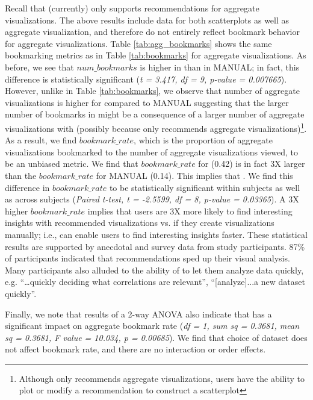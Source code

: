 Recall that \SeeDB (currently) only supports recommendations for aggregate visualizations.
The above results include data for both scatterplots as well as aggregate visualization, and
therefore do not entirely reflect bookmark behavior for aggregate visualizations.
Table \ref{tab:agg_bookmarks} shows the same bookmarking metrics as in Table \ref{tab:bookmarks}
for aggregate visualizations.
As before, we see that $num\_bookmarks$ is higher in \SeeDB than in MANUAL; in fact, this difference
is statistically significant ({\em t = 3.417, df = 9, p-value = 0.007665}).
However, unlike in Table \ref{tab:bookmarks}, we observe that number of aggregate visualizations 
is higher for \SeeDB compared to MANUAL suggesting that the larger number of bookmarks in \SeeDB 
might be a consequence of a larger number of aggregate visualizations with \SeeDB (possibly because
\SeeDB only recommends aggregate visualizations)\footnote{Although \SeeDB only recommends aggregate
visualizations, users have the ability to plot or modify a recommendation to construct a scatterplot}.
As a result, we find $bookmark\_rate$, which is the proportion of aggregate visualizations bookmarked
to the number of aggregate visualizations viewed, to be an unbiased metric.
We find that $bookmark\_rate$ for \SeeDB (0.42) is in fact 3X larger than the $bookmark\_rate$ for 
MANUAL (0.14).
This implies that .
We find this difference in $bookmark\_rate$ to be statistically significant within subjects as well 
as across subjects ({\em Paired t-test, t = -2.5599, df = 8, p-value = 0.03365}).
A 3X higher $bookmark\_rate$ implies that users are 3X more likely to find interesting insights with 
recommended visualizations vs. if they create visualizations manually; i.e., \SeeDB can enable users 
to find interesting insights faster.
These statistical results are supported by anecdotal and survey data from study participants.
87\% of participants indicated that \SeeDB recommendations sped up their visual analysis. 
Many participants also alluded to the ability of \SeeDB to let them analyze data quickly, e.g. 
``\ldots quickly deciding what correlations are relevant'', ``[analyze]...a new dataset quickly''.

Finally, we note that results of a 2-way ANOVA also indicate that \SeeDB has a significant impact on 
aggregate bookmark rate ({\em df = 1, sum sq = 0.3681, mean sq = 0.3681, F value = 10.034, p = 0.00685}). 
We find that choice of dataset does not affect bookmark rate, and there are no interaction or order effects.

